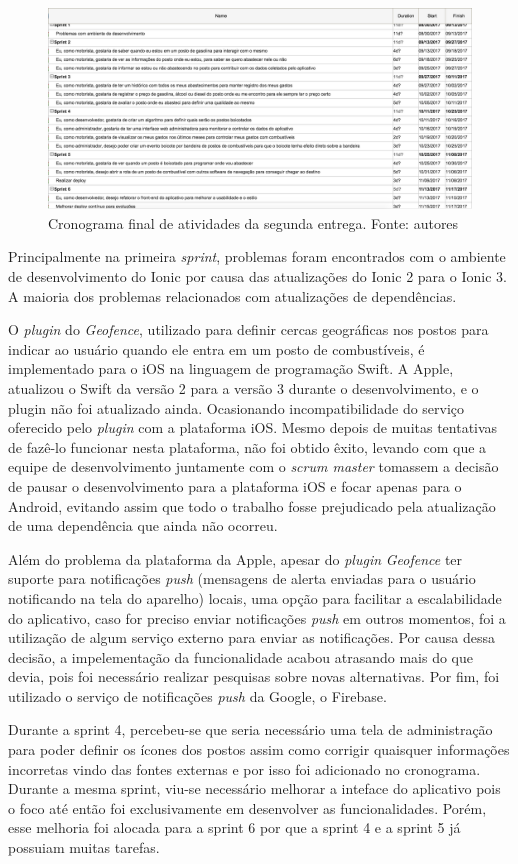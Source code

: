 \begin{figure}[H]
    \centering
    \includegraphics[scale=0.4]{figuras/cronograma_segunda_parte_2.png}
    \caption[Cronograma final de atividades da segunda entrega.]{Cronograma final de atividades da segunda entrega. Fonte: autores}
    \label{img:cronogramafinal}
\end{figure}

Principalmente na primeira \textit{sprint}, problemas foram encontrados com o ambiente de desenvolvimento do Ionic por causa das atualizações do Ionic 2 para o Ionic 3. A maioria dos problemas relacionados com atualizações de dependências.

O \textit{plugin} do \textit{Geofence}, utilizado para definir cercas geográficas nos postos para indicar ao usuário quando ele entra em um posto de combustíveis, é implementado para o iOS na linguagem de programação Swift. A Apple, atualizou o Swift da versão 2 para a versão 3 durante o desenvolvimento, e o plugin não foi atualizado ainda. Ocasionando incompatibilidade do serviço oferecido pelo \textit{plugin} com a plataforma iOS. Mesmo depois de muitas tentativas de fazê-lo funcionar nesta plataforma, não foi obtido êxito, levando com que a equipe de desenvolvimento juntamente com o \textit{scrum master} tomassem a decisão de pausar o desenvolvimento para a plataforma iOS e focar apenas para o Android, evitando assim que todo o trabalho fosse prejudicado pela atualização de uma dependência que ainda não ocorreu.

Além do problema da plataforma da Apple, apesar do \textit{plugin} \textit{Geofence} ter suporte para notificações \textit{push} (mensagens de alerta enviadas para o usuário notificando na tela do aparelho) locais, uma opção para facilitar a escalabilidade do aplicativo, caso for preciso enviar notificações \textit{push} em outros momentos, foi a utilização de algum serviço externo para enviar as notificações. Por causa dessa decisão, a impelementação da funcionalidade acabou atrasando mais do que devia, pois foi necessário realizar pesquisas sobre novas alternativas. Por fim, foi utilizado o serviço de notificações \textit{push} da Google, o Firebase.

Durante a sprint 4, percebeu-se que seria necessário uma tela de administração para poder definir os ícones dos postos assim como corrigir quaisquer informações incorretas vindo das fontes externas e por isso foi adicionado no cronograma. Durante a mesma sprint, viu-se necessário melhorar a inteface do aplicativo pois o foco até então foi exclusivamente em desenvolver as funcionalidades. Porém, esse melhoria foi alocada para a sprint 6 por que a sprint 4 e a sprint 5 já possuiam muitas tarefas.
